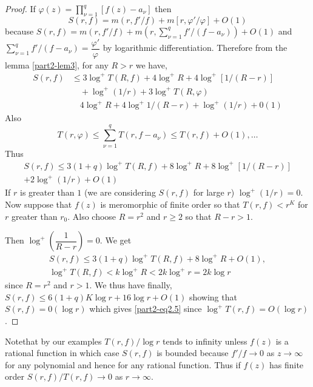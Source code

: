 \begin{proof}
If $\varphi(z)=\prod\limits^{q}_{\nu=1}[f(z)-a_{\nu}]$ then
$$
S(r,f)=m(r,f'/f)+m[r,\varphi'/\varphi]+O(1)
$$
because\pageoriginale
$S(r,f)=m(r,f'/f)+m(r,\sum\limits^{q}_{\nu=1}f'/(f-a_{\nu}))+O(1)$ and
$\sum\limits^{q}_{\nu=1}f'/(f-a_{\nu})=\dfrac{\varphi'}{\varphi}$ by
logarithmic differentiation. Therefore from the lemma \ref{part2-lem3},
for any $R>r$ we have,
\begin{align*}
S(r,f) &\leq 3\log^{+}T(R,f)+4\log^{+}R+4\log^{+}[1/(R-r)]\\
&\quad +\log^{+}(1/r)+3\log^{+}T(R,\varphi)\\
&\quad 4\log^{+}R+4\log^{+}1/(R-r)+\log^{+}(1/r)+0(1)
\end{align*}
Also
\begin{equation*}
T(r,\varphi)\leq \sum^{q}_{\nu=1}T(r,f-a_{\nu})\leq
T(r,f)+O(1),\ldots\tag{2.6}\label{part2-eq2.6} 
\end{equation*}
Thus 
\begin{gather*}
S(r,f)\leq 3(1+q)\log^{+} T(R,f)+8\log^{+}R+8\log^{+}[1/(R-r)]\\
+2\log^{+}(1/r)+O(1)
\end{gather*}
If $r$ is greater than $1$ (we are considering $S(r,f)$ for large $r$)
$\log^{+}(1/r)=0$. Now suppose that $f(z)$ is meromorphic of finite
order so that $T(r,f)<r^{K}$ for $r$ greater than $r_{0}$. Also choose
$R=r^{2}$ and $r\geq 2$ so that $R-r>1$.

Then $\log^{+}\left(\dfrac{1}{R-r}\right)=0$. We get
\begin{gather*}
S(r,f)\leq 3(1+q)\log^{+}T(R,f)+8\log^{+}R+ O(1),\\
\log^{+}T(R,f)<k\log^{+}R<2k\log^{+}r=2k\log r
\end{gather*}
since $R=r^{2}$ and $r>1$. We thus have finally, $S(r,f)\leq
6(1+q)K\log r+16\log r+O(1)$ showing that $S(r,f)=0(\log r)$ which
gives \eqref{part2-eq2.5} since $\log^{+}T(r,f)=O(\log r)$.
\end{proof}

Note\pageoriginale that by our examples $T(r,f)/\log r$ tends to
infinity unless $f(z)$ is a rational function in which case $S(r,f)$
is bounded because $f'/f\to 0$ as $z\to \infty$ for any polynomial and
hence for any rational function. Thus if $f(z)$ has finite order
$S(r,f)/T(r,f)\to 0$ as $r\to \infty$. 

